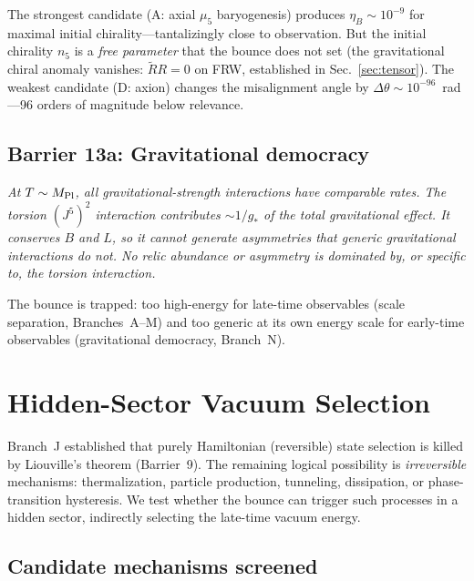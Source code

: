 \documentclass[aps,prd,twocolumn,superscriptaddress,showpacs,preprintnumbers,
  nofootinbib,longbibliography,floatfix]{revtex4-2}
\newcommand{\MPl}{M_{\rm Pl}}
\begin{document}
The strongest candidate (A: axial $\mu_5$ baryogenesis) produces
$\eta_B \sim 10^{-9}$ for maximal initial chirality---tantalizingly close
to observation. But the initial chirality $n_5$ is a \textit{free parameter}
that the bounce does not set (the gravitational chiral anomaly vanishes:
$\tilde{R}R = 0$ on FRW, established in Sec.~\ref{sec:tensor}). The
weakest candidate (D: axion) changes the misalignment angle by
$\Delta\theta \sim 10^{-96}$~rad---96 orders of magnitude below relevance.

\subsection{Barrier 13a: Gravitational democracy}

\textit{At $T \sim \MPl$, all gravitational-strength interactions have
comparable rates. The torsion $(J^5)^2$ interaction contributes
$\sim\!1/g_*$ of the total gravitational effect. It conserves $B$ and $L$,
so it cannot generate asymmetries that generic gravitational interactions
do not. No relic abundance or asymmetry is dominated by, or specific to,
the torsion interaction.}

The bounce is trapped: too high-energy for late-time observables (scale
separation, Branches~A--M) and too generic at its own energy scale for
early-time observables (gravitational democracy, Branch~N).


\section{Hidden-Sector Vacuum Selection}\label{sec:hidden}

Branch~J established that purely Hamiltonian (reversible) state selection
is killed by Liouville's theorem (Barrier~9). The remaining logical
possibility is \textit{irreversible} mechanisms: thermalization, particle
production, tunneling, dissipation, or phase-transition hysteresis. We
test whether the bounce can trigger such processes in a hidden sector,
indirectly selecting the late-time vacuum energy.

\subsection{Candidate mechanisms screened}
\end{document}
